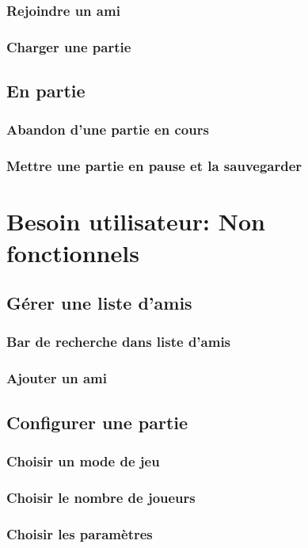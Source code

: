 \documentclass[utf8]{article}
\begin{document}
    \subsubsection{Rejoindre un ami}
    \subsubsection{Charger une partie}
  \subsection{En partie}
    \subsubsection{Abandon d'une partie en cours}
    \subsubsection{Mettre une partie en pause et la sauvegarder}




\section{Besoin utilisateur: Non fonctionnels}
    \subsection{Gérer une liste d'amis}
        \subsubsection{Bar de recherche dans liste d'amis}
        \subsubsection{Ajouter un ami}
    \subsection{Configurer une partie}
        \subsubsection{Choisir un mode de jeu}
        \subsubsection{Choisir le nombre de joueurs}
        \subsubsection{Choisir les paramètres}
\end{document}
